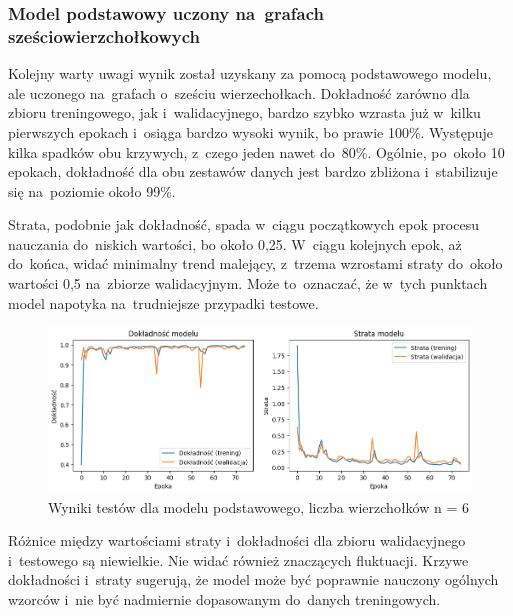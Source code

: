 \subsubsection{Model podstawowy uczony na~grafach sześciowierzchołkowych}

Kolejny warty uwagi wynik został uzyskany za pomocą podstawowego modelu, ale uczonego na~grafach o~sześciu wierzechołkach.
Dokładność zarówno dla zbioru treningowego, jak i~walidacyjnego, bardzo szybko wzrasta już w~kilku pierwszych epokach
i~osiąga bardzo wysoki wynik, bo prawie 100\%.
Występuje kilka spadków obu krzywych, z~czego jeden nawet do~80\%.
Ogólnie, po~około 10 epokach, dokładność dla obu zestawów danych jest bardzo zbliżona i~stabilizuje się na~poziomie około 99\%.

Strata, podobnie jak dokładność, spada w~ciągu początkowych epok procesu nauczania do~niskich wartości, bo około 0,25.
W~ciągu kolejnych epok, aż do~końca, widać minimalny trend malejący, z~trzema wzrostami straty do~około wartości 0,5 na~zbiorze walidacyjnym.
Może to~oznaczać, że w~tych punktach model napotyka na~trudniejsze przypadki testowe.

\begin{figure}[ht]
	\centering
	\includegraphics[width=15.5cm]{resources/tests/images/v3/base6_img.png}
	\caption{Wyniki testów dla modelu podstawowego, liczba wierzchołków n = 6}
	\label{Fig:tests-base-3a}
\end{figure}
\FloatBarrier

Różnice między wartościami straty i~dokładności dla zbioru walidacyjnego i~testowego są niewielkie.
Nie widać również znaczących fluktuacji.
Krzywe dokładności i~straty sugerują, że model może być poprawnie nauczony ogólnych wzorców
i~nie być nadmiernie dopasowanym do~danych treningowych.

